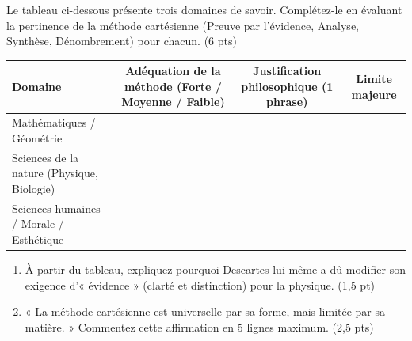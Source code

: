 \documentclass[11pt]{article}
\begin{document}
\begin{exercice}
Le tableau ci-dessous présente trois domaines de savoir. Complétez-le en évaluant la pertinence de la méthode cartésienne (Preuve par l'évidence, Analyse, Synthèse, Dénombrement) pour chacun. (6 pts)

\begin{tabularx}{\linewidth}{|X|c|c|c|}
\hline
\textbf{Domaine} & \textbf{Adéquation de la méthode (Forte / Moyenne / Faible)} & \textbf{Justification philosophique (1 phrase)} & \textbf{Limite majeure} \\
\hline
Mathématiques / Géométrie & & & \\
\hline
Sciences de la nature (Physique, Biologie) & & & \\
\hline
Sciences humaines / Morale / Esthétique & & & \\
\hline
\end{tabularx}

\begin{enumerate}
    \item À partir du tableau, expliquez pourquoi Descartes lui-même a dû modifier son exigence d'« évidence » (clarté et distinction) pour la physique. (1,5 pt)
    \item « La méthode cartésienne est universelle par sa forme, mais limitée par sa matière. » Commentez cette affirmation en 5 lignes maximum. (2,5 pts)
\end{enumerate}
\end{exercice}
\end{document}

